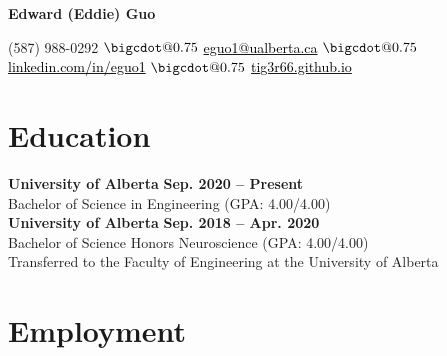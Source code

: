 \documentclass{article}
\makeatletter
\newcommand*\bigcdot{\mathpalette\bigcdot@{0.75}}
\newcommand*\bigcdot@[2]{\mathbin{\vcenter{\hbox{\scalebox{#2}{$\m@th#1\bullet$}}}}}
\makeatother
\begin{document}
\thispagestyle{plain}
\LARGE \textbf{\textcolor{my_colour}{Edward (Eddie) Guo}} \vspace{.25em}

\normalfont \normalsize
(587) 988-0292
    \hspace{.25em} $\bigcdot$ \hspace{.25em}
\href{mailto:eguo1@ualberta.ca}{\textcolor{black}{eguo1@ualberta.ca}}
    \hspace{.25em} $\bigcdot$ \hspace{.25em}
\href{https://www.linkedin.com/in/eguo1}{\textcolor{black}{linkedin.com/in/eguo1}}
    \hspace{.25em} $\bigcdot$ \hspace{.25em}
\href{https://tig3r66.github.io/index.html}{\textcolor{black}{tig3r66.github.io}}
\vspace{-.25em}


\section*{\textcolor{my_colour}{Education}}
\vspace{-.25em} \hrulefill \vspace{.75em}

\textbf{University of Alberta} \hfill \textbf{Sep. 2020 -- Present}\\
Bachelor of Science in Engineering (GPA: 4.00/4.00)\\


\textbf{University of Alberta} \hfill \textbf{Sep. 2018 -- Apr. 2020}\\
Bachelor of Science Honors Neuroscience (GPA: 4.00/4.00)\\
Transferred to the Faculty of Engineering at the University of Alberta


\section*{\textcolor{my_colour}{Employment}}
\vspace{-.25em} \hrulefill \vspace{.75em}
\end{document}
